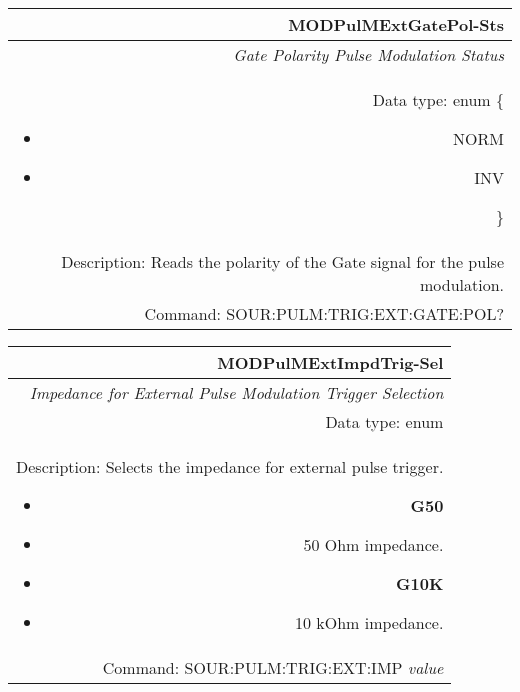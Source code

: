 \documentclass[openany]{article}
\begin{document}
		\begin{tabular}{N}
			\hline
			\bfseries MODPulMExtGatePol-Sts \\ \hline
			\emph{Gate Polarity Pulse Modulation Status} \\
			Data type: enum \{\begin{itemize}[noitemsep]
				\small
				\item[] NORM
				\item[] INV
			\end{itemize}\} \\ 
			Description: Reads the polarity of the Gate signal for the pulse modulation. \\
			Command: SOUR:PULM:TRIG:EXT:GATE:POL? \\

		\end{tabular}
%
		\begin{tabular}{N}
			\hline
			\bfseries MODPulMExtImpdTrig-Sel \\ \hline
			\emph{Impedance for External Pulse Modulation Trigger Selection} \\
			Data type: enum \\  
			Description: Selects the impedance for external pulse trigger. \begin{itemize}[noitemsep]
				\small
				\item[] \textbf{G50}
				\item[] 50 Ohm impedance.
                                \item[] \textbf{G10K}
				\item[] 10 kOhm impedance.
			\end{itemize} \\
			Command: SOUR:PULM:TRIG:EXT:IMP \emph{value} \\

		\end{tabular}
\end{document}
